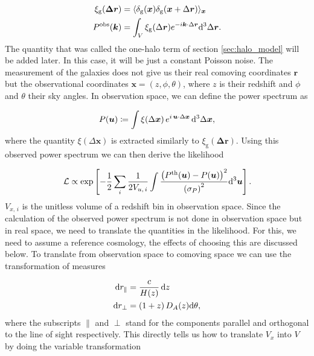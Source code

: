 \documentclass[../main.tex]{subfiles}
\begin{document}
\begin{align}
    \xi_\mathrm{g}(\boldsymbol{\Delta r}) &= \langle \delta_\mathrm{g}(\boldsymbol{x}) \delta_\mathrm{g}(\boldsymbol{x}+\Delta \boldsymbol{r}) \rangle_{\boldsymbol{x}}\\
    P^\mathrm{obs}(\boldsymbol{k}) &= \int_V \xi_\mathrm{g}(\Delta \boldsymbol{r}) e^{-i \boldsymbol{k}\cdot \Delta \boldsymbol{r}} \mathrm{d}^3 \Delta\boldsymbol{r}.
\end{align}
The quantity that was called the one-halo term of section \ref{sec:halo_model} will be added later. In this case, it will be just a constant Poisson noise.
The measurement of the galaxies does not give us their real comoving coordinates $\boldsymbol{r}$ but the observational coordinates $\boldsymbol{x}=(z,\phi,\theta)$, where $z$ is their redshift and $\phi$ and $\theta$ their sky angles. In observation space, we can define the power spectrum as 

\begin{equation}
    P(\boldsymbol{u}) \coloneqq \int \xi(\Delta \boldsymbol{x}) \, e^{i \, \boldsymbol{u}\cdot \Delta\boldsymbol{x}} \,\mathrm{d}^3 \Delta\boldsymbol{x},
 \end{equation} 
where the quantity $\xi(\Delta \boldsymbol{x})$ is extracted similarly to $\xi_\mathrm{g}(\boldsymbol{\Delta r}) $. Using this observed power spectrum we can then derive the likelihood 

 \begin{equation}
    \mathcal{L} \propto \exp\left[-\frac{1}{2} \sum_i \frac{1}{2 V_{u,\,i}} \int \frac{\left(P^\mathrm{th}(\boldsymbol{u})-P(\boldsymbol{u})\right)^2}{\left(\sigma_{P}\right)^2} \mathrm{d}^3 \boldsymbol{u} \right].
 \end{equation}
$V_{x,\, i}$ is the unitless volume of a redshift bin in observation space. Since the calculation of the observed power spectrum is not done in observation space but in real space, we need to translate the quantities in the likelihood. For this, we need to assume a reference cosmology, the effects of choosing this are discussed below. To translate from observation space to comoving space we can use the transformation of measures

\begin{align}
    \mathrm{d} r_{\|} &= \frac{c}{H(z)}\, \mathrm{d} z     \nonumber\\
    \mathrm{d} r_\perp &= \left( 1+ z \right) D_A(z) \mathrm{d} \theta,     \label{eq:transformation_orth}
\end{align} 
where the subscripts $\|$ and $\perp$ stand for the components parallel and orthogonal to the line of sight respectively. This directly tells us how to translate $V_x$ into $V$ by doing the variable transformation 
\end{document}
